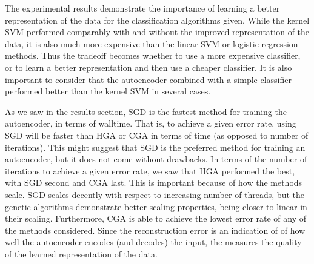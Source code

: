 The experimental results demonstrate the importance of learning a better representation of the data for the classification algorithms given. While the kernel SVM performed comparably with and without the improved representation of the data, it is also much more expensive than the linear SVM or logistic regression methods. Thus the tradeoff becomes whether to use a more expensive classifier, or to learn a better representation and then use a cheaper classifier. It is also important to consider that the autoencoder combined with a simple classifier performed better than the kernel SVM in several cases.

As we saw in the results section, SGD is the fastest method for training the autoencoder, in terms of walltime. That is, to achieve a given error rate, using SGD will be faster than HGA or CGA in terms of time (as opposed to number of iterations). This might suggest that SGD is the preferred method for training an autoencoder, but it does not come without drawbacks. In terms of the number of iterations to achieve a given error rate, we saw that HGA performed the best, with SGD second and CGA last. This is important because of how the methods scale. SGD scales decently with respect to increasing number of threads, but the genetic algorithms demonstrate better scaling properties, being closer to linear in their scaling. 
Furthermore, CGA is able to achieve the lowest error rate of any of the methods considered. Since the reconstruction error is an indication of of how well the autoencoder encodes (and decodes) the input, the measures the quality of the learned representation of the data.
